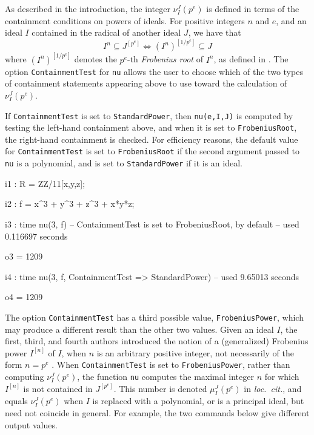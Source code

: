 \documentclass{amsart}
\begin{document}

As described in the introduction, the integer $\nu_I^J(p^e)$ is defined in terms of the containment conditions on powers of ideals.
For positive integers $n$ and $e$, and an ideal $I$ contained in the radical of another ideal $J$, we have that
\begin{equation*}
  I^n \subseteq J^{[p^e]} \Longleftrightarrow (I^n)^{[1/p^e]} \subseteq J
\end{equation*}
where $(I^n)^{[1/p^e]}$ denotes the $p^e$-th \emph{Frobenius root} of $I^n$, as defined in \cite{BlickleMustataSmithDiscretenessAndRationalityOfFThresholds}.
The option {\tt ContainmentTest} for {\tt nu} allows the user to choose which of the two types of containment statements appearing above to use toward the calculation of $\nu_I^J(p^e)$.

If {\tt ContainmentTest} is set to {\tt StandardPower}, then {\tt nu(e,I,J)} is computed by testing the left-hand containment above, and when it is set to {\tt FrobeniusRoot}, the right-hand containment is checked.
For efficiency reasons, the default value for {\tt ContainmentTest} is set to  {\tt FrobeniusRoot} if the second argument passed to {\tt nu} is a polynomial, and is set to {\tt StandardPower} if it is an ideal.

{\small
{}
\begin{MyVerbatim}

i1 : R = ZZ/11[x,y,z];

i2 : f = x^3 + y^3 + z^3 + x*y*z;

i3 : time nu(3, f) -- ContainmentTest is set to FrobeniusRoot, by default
     -- used 0.116697 seconds

o3 = 1209

i4 : time nu(3, f, ContainmentTest => StandardPower)
     -- used 9.65013 seconds

o4 = 1209
\end{MyVerbatim}
}
\medspace


The option {\tt ContainmentTest} has a third possible value, {\tt FrobeniusPower}, which may produce a different result than the other two values.
Given an ideal $I$, the first, third, and fourth authors introduced the notion of a (generalized) Frobenius power $I^{[n]}$ of $I$, when $n$ is an arbitrary positive integer, not necessarily of the form $n = p^e$ \cite{hernandez+etal.frobenius_powers}.
When {\tt ContainmentTest} is set to {\tt FrobeniusPower}, rather than  computing $\nu_I^J(p^e)$, the function {\tt nu} computes the
maximal integer $n$ for which $I^{[n]}$ is not contained in $J^{[p^e]}$.  This number is denoted $\mu_I^J(p^e)$ in \emph{loc.\ cit.}, and equals $\nu_I^J(p^e)$ when $I$ is replaced with a polynomial, or is a principal ideal, but need not coincide in general.
For example, the two commands below give different output values.
\end{document}
